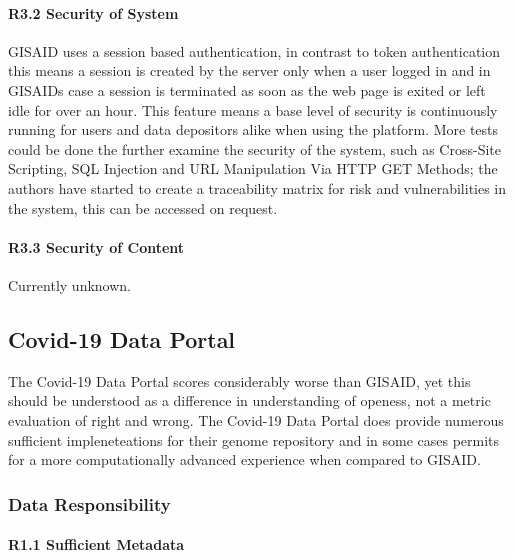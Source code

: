 \documentclass{article}
\begin{document}
\hypertarget{r3.2-security-of-system}{%
\paragraph{R3.2 Security of System}\label{r3.2-security-of-system}}

GISAID uses a session based authentication, in contrast to token
authentication this means a session is created by the server only when a
user logged in and in GISAIDs case a session is terminated as soon as
the web page is exited or left idle for over an hour. This feature means
a base level of security is continuously running for users and data
depositors alike when using the platform. More tests could be done the
further examine the security of the system, such as Cross-Site
Scripting, SQL Injection and URL Manipulation Via HTTP GET Methods; the
authors have started to create a traceability matrix for risk and
vulnerabilities in the system, this can be accessed on request.

\hypertarget{r3.3-security-of-content}{%
\paragraph{R3.3 Security of Content}\label{r3.3-security-of-content}}

Currently unknown.

\newpage

\hypertarget{covid-19-data-portal}{%
\subsection{Covid-19 Data Portal}\label{covid-19-data-portal}}

The Covid-19 Data Portal scores considerably worse than GISAID, yet this
should be understood as a difference in understanding of openess, not a
metric evaluation of right and wrong. The Covid-19 Data Portal does
provide numerous sufficient impleneteations for their genome repository
and in some cases permits for a more computationally advanced experience
when compared to GISAID.

\hypertarget{data-responsibility-2}{%
\subsubsection{Data Responsibility}\label{data-responsibility-2}}

\hypertarget{r1.1-sufficient-metadata-1}{%
\paragraph{R1.1 Sufficient Metadata}\label{r1.1-sufficient-metadata-1}}
\end{document}
